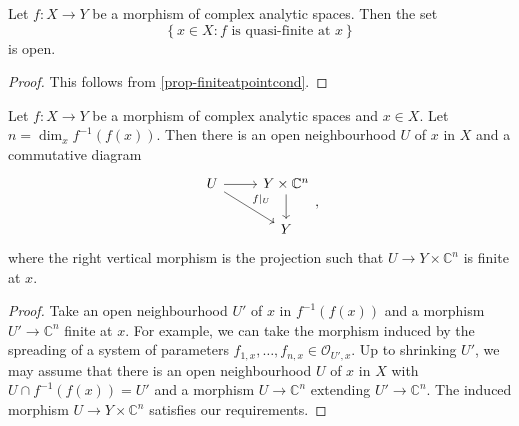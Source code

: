 \begin{corollary}
    Let $f:X\rightarrow Y$ be a morphism of complex analytic spaces. Then the set
    \[
        \left\{ x\in X: f\text{ is quasi-finite at }x\right\}  
    \]
    is open.
\end{corollary}
\begin{proof}
    This follows from \cref{prop-finiteatpointcond}.
\end{proof}



\begin{proposition}\label{prop-fibercodimmorphismtoprodCn}
    Let $f:X\rightarrow Y$ be a morphism of complex analytic spaces and $x\in X$. Let $n=\dim_x f^{-1}(f(x))$. Then there is an open neighbourhood $U$ of $x$ in $X$ and a commutative diagram
    \[
        \begin{tikzcd}
            U \arrow[r] \arrow[rd, "f|_U"] & Y\times \mathbb{C}^n \arrow[d] \\
                                           & Y                             
            \end{tikzcd},    
    \]
    where the right vertical morphism is the projection such that $U\rightarrow Y\times \mathbb{C}^n$ is finite at $x$.
\end{proposition}
\begin{proof}
    Take an open neighbourhood $U'$ of $x$ in $f^{-1}(f(x))$ and a morphism $U'\rightarrow \mathbb{C}^n$ finite at $x$. For example, we can take the morphism induced by the spreading of a system of parameters $f_{1,x},\ldots,f_{n,x}\in \mathcal{O}_{U',x}$. Up to shrinking $U'$, we may assume that there is an open neighbourhood $U$ of $x$ in $X$ with $U\cap f^{-1}(f(x))=U'$ and a morphism $U\rightarrow \mathbb{C}^n$ extending $U'\rightarrow \mathbb{C}^n$. The induced morphism $U\rightarrow Y\times \mathbb{C}^n$ satisfies our requirements.
\end{proof}


